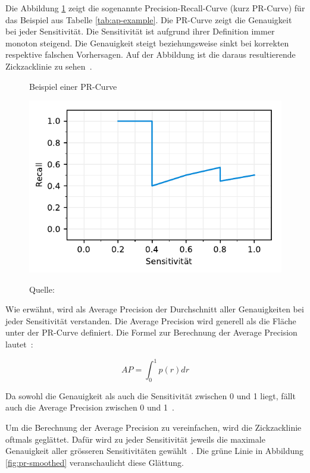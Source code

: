Die Abbildung \ref{fig:ap-pr} zeigt die sogenannte Precision-Recall-Curve (kurz PR-Curve) für das Beispiel aus Tabelle \ref{tab:ap-example}. Die PR-Curve zeigt die Genauigkeit bei jeder Sensitivität. Die Sensitivität ist aufgrund ihrer Definition immer monoton steigend. Die Genauigkeit steigt beziehungsweise sinkt bei korrekten respektive falschen Vorhersagen. Auf der Abbildung ist die daraus resultierende Zickzacklinie zu sehen~\autocite{AP}.

\begin{figure}[h!]
    \captionsetup{width=.9\linewidth}
    \caption{Beispiel einer PR-Curve}
    \label{fig:ap-pr}
    \centering
    \includegraphics[scale=1]{graphics/matplot/ap__pr.pdf}\\
    \caption*{Quelle: \textcite{AP}}
\end{figure}

Wie erwähnt, wird als Average Precision der Durchschnitt aller Genauigkeiten bei jeder Sensitivität verstanden. Die Average Precision wird generell als die Fläche unter der PR-Curve definiert. Die Formel zur Berechnung der Average Precision lautet~\autocite{AP}:

\nopagebreak 
$$AP = \int_{0}^{1}p(r)dr$$
\vspace*{0.2cm}

Da sowohl die Genauigkeit als auch die Sensitivität zwischen 0 und 1 liegt, fällt auch die Average Precision zwischen 0 und 1~\autocite{AP}.

Um die Berechnung der Average Precision zu vereinfachen, wird die Zickzacklinie oftmals geglättet. Dafür wird zu jeder Sensitivität jeweils die maximale Genauigkeit aller grösseren Sensitivitäten gewählt~\autocite{AP}. Die grüne Linie in Abbildung \ref{fig:pr-smoothed} veranschaulicht diese Glättung.

